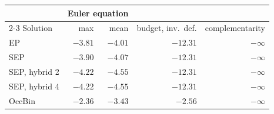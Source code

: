 \begin{tabular}{lrrrr}
\toprule
& \multicolumn{2}{c}{Euler equation} & & \\ \cmidrule(lr){2-3} Solution & max & mean & budget, inv.~def. & complementarity \\
\midrule
EP & $-3.81$ & $-4.01$ & $-12.31$ & $-\infty$ \\
SEP & $-3.90$ & $-4.07$ & $-12.31$ & $-\infty$ \\
SEP, hybrid 2 & $-4.22$ & $-4.55$ & $-12.31$ & $-\infty$ \\
SEP, hybrid 4 & $-4.22$ & $-4.55$ & $-12.31$ & $-\infty$ \\
OccBin & $-2.36$ & $-3.43$ & $-2.56$ & $-\infty$ \\
\bottomrule
\end{tabular}
